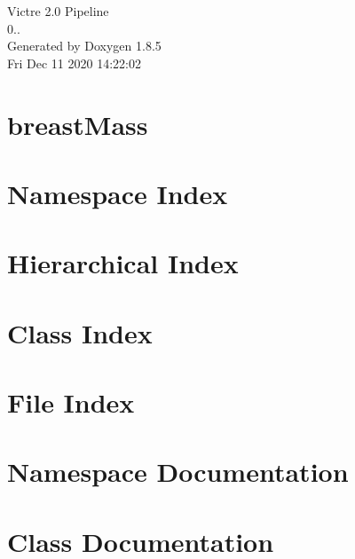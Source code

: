 \documentclass[twoside]{book}
\newcommand{\clearemptydoublepage}{%
  \newpage{\pagestyle{empty}\cleardoublepage}%
}
\begin{document}
\hypersetup{pageanchor=false}
\begin{titlepage}
\vspace*{7cm}
\begin{center}%
{\Large Victre 2.0 Pipeline \\[1ex]\large 0.. }\\
\vspace*{1cm}
{\large Generated by Doxygen 1.8.5}\\
\vspace*{0.5cm}
{\small Fri Dec 11 2020 14:22:02}\\
\end{center}
\end{titlepage}
\clearemptydoublepage
\tableofcontents
\clearemptydoublepage
{}
\hypersetup{pageanchor=true}

\chapter{breast\-Mass}
\label{md_Victre_breastMass_README}
\hypertarget{md_Victre_breastMass_README}{}

\chapter{Namespace Index}

\chapter{Hierarchical Index}

\chapter{Class Index}

\chapter{File Index}

\chapter{Namespace Documentation}










\chapter{Class Documentation}



\end{document}
